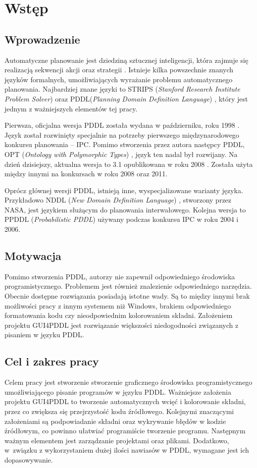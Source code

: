 \chapter{Wstęp}
\section{Wprowadzenie}
	Automatyczne planowanie jest dziedziną sztucznej inteligencji, która zajmuje się realizacją sekwencji akcji oraz strategii \cite{planning}. Istnieje kilka powszechnie znanych języków formalnych, umożliwiających wyrażanie problemu automatycznego planowania. Najbardziej znane języki to STRIPS (\textit{Stanford Research Institute Problem Solver}) \cite{strips} oraz PDDL(\textit{Planning Domain Definition Language}) \cite{pddl}, który jest jednym z ważniejszych elementów tej pracy.
	
	Pierwsza, oficjalna wersja PDDL została wydana w październiku, roku 1998 \cite{pddl}. Język został rozwinięty specjalnie na potrzeby pierwszego międzynarodowego konkursu planowania – IPC. Pomimo stworzenia przez autora następcy PDDL, OPT (\textit{Ontology with Polymorphic Types}) \cite{opt}, język ten nadal był rozwijany. Na dzień dzisiejszy, aktualna wersja to 3.1 opublikowana w roku 2008 \cite{pddl3.1}. Została użyta między innymi na konkursach w roku 2008 oraz 2011.

	Oprócz głównej wersji PDDL, istnieją  inne, wyspecjalizowane warianty języka. Przykładowo  NDDL (\textit{New Domain Definition Language}) \cite{npdl}, stworzony przez NASA, jest językiem służącym do planowania interwałowego. Kolejna wersja to PPDDL (\textit{Probabilistic PDDL}) \cite{ppddl} używany podczas konkursu IPC w roku 2004 i 2006.


\section{Motywacja}
Pomimo stworzenia PDDL, autorzy nie zapewnił odpowiedniego środowiska programistycznego. Problemem jest również znalezienie odpowiedniego narzędzia. Obecnie dostępne rozwiązania posiadają istotne wady. Są to między innymi brak możliwości pracy z innym systemem  niż Windows, brakiem odpowiedniego formatowania kodu czy nieodpowiednim kolorowaniem składni. Założeniem projektu GUI4PDDL jest rozwiązanie większości niedogodności związanych z pisaniem w języku PDDL.
\section{Cel i zakres pracy}
Celem pracy jest stworzenie stworzenie graficznego środowiska programistycznego umożliwiającego pisanie programów w języku PDDL. Ważniejsze założenia projektu GUI4PDDL to tworzenie automatycznych wcięć i kolorowanie składni, przez co zwiększa się przejrzystość kodu źródłowego. Kolejnymi znaczącymi założeniami są podpowiadanie składni oraz wykrywanie błędów w kodzie źródłowym, co powinno ułatwiać programiście tworzenie programu. Następnym ważnym elementem jest zarządzanie projektami oraz plikami. Dodatkowo, w~związku z wykorzystaniem dużej ilości nawiasów w PDDL, wymagane jest ich dopasowywanie. 

